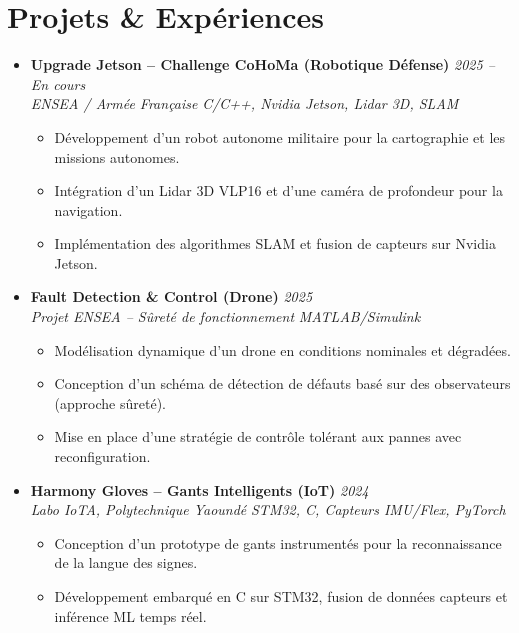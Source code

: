 \documentclass[a4paper,11pt]{article}
\begin{document}
\section{Projets \& Expériences}
\begin{itemize}[leftmargin=*, label={-}]

\item \textbf{Upgrade Jetson -- Challenge CoHoMa (Robotique Défense)} \hfill \textit{2025 -- En cours} \\
\textit{ENSEA / Armée Française} \hfill \textit{C/C++, Nvidia Jetson, Lidar 3D, SLAM}
\vspace{-2pt}
    \begin{itemize}[leftmargin=0.4cm, nosep, label=\tiny$\bullet$]
        \item \small{Développement d'un robot autonome militaire pour la cartographie et les missions autonomes.}
        \item \small{Intégration d'un Lidar 3D VLP16 et d'une caméra de profondeur pour la navigation.}
        \item \small{Implémentation des algorithmes SLAM et fusion de capteurs sur Nvidia Jetson.}
    \end{itemize}
\vspace{3pt}

\item \textbf{Fault Detection \& Control (Drone)} \hfill \textit{2025} \\
\textit{Projet ENSEA -- Sûreté de fonctionnement} \hfill \textit{MATLAB/Simulink}
\vspace{-2pt}
    \begin{itemize}[leftmargin=0.4cm, nosep, label=\tiny$\bullet$]
        \item \small{Modélisation dynamique d'un drone en conditions nominales et dégradées.}
        \item \small{Conception d'un schéma de détection de défauts basé sur des observateurs (approche sûreté).}
        \item \small{Mise en place d'une stratégie de contrôle tolérant aux pannes avec reconfiguration.}
    \end{itemize}
\vspace{3pt}

\item \textbf{Harmony Gloves -- Gants Intelligents (IoT)} \hfill \textit{2024} \\
\textit{Labo IoTA, Polytechnique Yaoundé} \hfill \textit{STM32, C, Capteurs IMU/Flex, PyTorch}
\vspace{-2pt}
    \begin{itemize}[leftmargin=0.4cm, nosep, label=\tiny$\bullet$]
        \item \small{Conception d'un prototype de gants instrumentés pour la reconnaissance de la langue des signes.}
        \item \small{Développement embarqué en C sur STM32, fusion de données capteurs et inférence ML temps réel.}
    \end{itemize}
\vspace{3pt}


\end{itemize}
\end{document}
